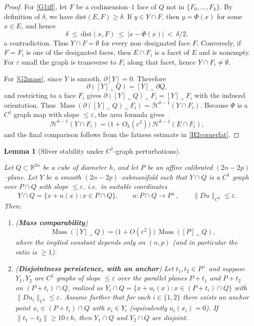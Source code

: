 \documentclass[11pt]{article}
\numberwithin{equation}{section}  %
\theoremstyle{plain}
\newtheorem{lemma}[theorem]{Lemma}
\theoremstyle{definition}
\theoremstyle{remark}
\newcommand{\R}{\mathbb{R}}
\DeclareMathOperator{\Mass}{Mass}
\newcommand{\dist}{\mathrm{dist}}
\begin{document}
\begin{proof}

For \eqref{G1iff}, let $F$ be a codimension--$1$ face of $Q$ not in $\{F_0,\dots,F_k\}$.
By definition of $\delta$, we have $\dist(E,F)\ge \delta$.
If $y\in Y\cap F$, then $y=\Phi(x)$ for some $x\in E$, and hence
\[
\delta\ \le\ \dist(x,F)\ \le\ |x-\Phi(x)|\ <\ \delta/2,
\]
a contradiction.  Thus $Y\cap F=\emptyset$ for every non--designated face $F$.
Conversely, if $F=F_i$ is one of the designated faces, then $E\cap F_i$ is a facet of $E$ and is nonempty.
For $\varepsilon$ small the graph is transverse to $F_i$ along that facet, hence $Y\cap F_i\neq\emptyset$.

For \eqref{G2mass}, since $Y$ is smooth, $\partial[Y]=0$. Therefore
\[
\partial([Y]\llcorner Q)= [Y]\llcorner \partial Q,
\]
and restricting to a face $F_i$ gives
$\partial([Y]\llcorner Q)\llcorner F_i = [Y]\llcorner F_i$ with the induced orientation.
Thus $\Mass(\partial([Y]\llcorner Q)\llcorner F_i)=\mathcal H^{k-1}(Y\cap F_i)$.
Because $\Phi$ is a $C^1$ graph map with slope $\le \varepsilon$, the area formula gives
\[
\mathcal H^{k-1}(Y\cap F_i)=\bigl(1+O_k(\varepsilon^2)\bigr)\,\mathcal H^{k-1}(E\cap F_i),
\]
and the final comparison follows from the fatness estimate in \eqref{H2cornerfat}.

\end{proof}

\begin{lemma}[Sliver stability under $C^1$-graph perturbations]\label{lem:sliver-stability}

Let $Q\subset\R^{2n}$ be a cube of diameter $h$, and let $P$ be an affine calibrated $(2n-2p)$--plane.
Let $Y$ be a smooth $(2n-2p)$--submanifold such that $Y\cap Q$ is a $C^1$ graph over $P\cap Q$ with slope $\le \varepsilon$, i.e.\
in suitable coordinates
\[
Y\cap Q=\{x+u(x):x\in P\cap Q\},
\qquad
u:P\cap Q\to P^\perp,
\qquad
\|Du\|_{C^0}\le \varepsilon.
\]
Then:
\begin{enumerate}
\item[\textnormal{(i)}] (\textbf{Mass comparability})
\[
\Mass([Y]\llcorner Q) = \bigl(1+O(\varepsilon^2)\bigr)\,\Mass([P]\llcorner Q),
\]
where the implied constant depends only on $(n,p)$ (and in particular the ratio is $\ge 1$).
\item[\textnormal{(ii)}] (\textbf{Disjointness persistence, with an anchor}) 
Let $t_1,t_2\in P^\perp$ and suppose $Y_1,Y_2$ are $C^1$ graphs of slope $\le \varepsilon$ over the parallel planes
$P+t_1$ and $P+t_2$ on $(P+t_i)\cap Q$, realized as $Y_i\cap Q=\{x+u_i(x):x\in (P+t_i)\cap Q\}$ with $\|Du_i\|_{C^0}\le\varepsilon$.
Assume further that for each $i\in\{1,2\}$ there exists an \emph{anchor point} $x_i\in (P+t_i)\cap Q$ with $x_i\in Y_i$
(equivalently $u_i(x_i)=0$).
If $\|t_1-t_2\|\ge 10\,\varepsilon\,h$, then $Y_1\cap Q$ and $Y_2\cap Q$ are disjoint.
\end{enumerate}

\end{lemma}
\end{document}
